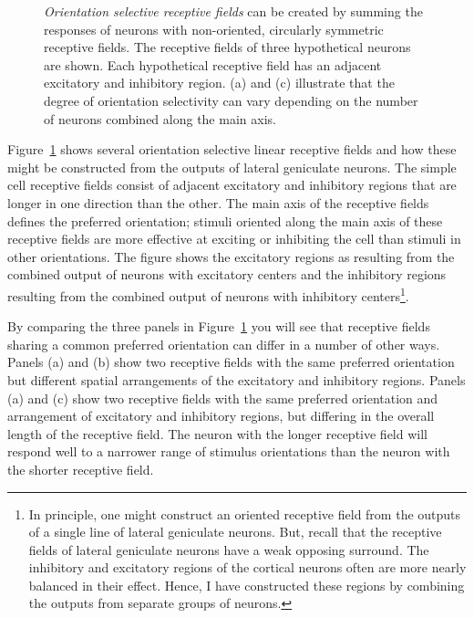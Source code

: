 \begin{figure}
\centerline {
}
\caption[Orientation Theory]{
{\em Orientation selective receptive fields} can be created by summing
the responses of neurons with non-oriented, circularly symmetric
receptive fields.  The receptive fields of three hypothetical neurons
are shown.  Each hypothetical
receptive field has an adjacent excitatory and inhibitory
region.  (a) and (c) illustrate that the degree of
orientation selectivity can vary depending on
the number of neurons combined along the main axis.}
\label{f5:orientedRF}
\end{figure}
Figure~\ref{f5:orientedRF} shows several
orientation selective linear receptive fields and how these
might be constructed from the outputs of lateral geniculate neurons.
The simple cell receptive fields consist of 
adjacent excitatory and inhibitory regions that are longer
in one direction than the other.
The main axis of the receptive fields defines the preferred
orientation;
stimuli oriented along the main axis of these receptive
fields are more effective at exciting or inhibiting the
cell than stimuli in other orientations.
The figure shows the
excitatory regions as resulting from the combined output of
neurons with excitatory centers and the inhibitory regions
resulting from the combined output of neurons with inhibitory centers\footnote{
In principle, one might construct an oriented receptive field
from the outputs of a single line of lateral geniculate neurons.
But, recall that the receptive fields of lateral geniculate
neurons have a weak opposing surround.
The inhibitory and excitatory regions of the
cortical neurons often are more nearly balanced in their effect.
Hence, I have constructed these regions by combining the outputs
from separate groups of neurons.}.

By comparing the three panels in
Figure~\ref{f5:orientedRF} you will see that
receptive fields sharing a common preferred orientation
can differ in a number of other ways.
Panels (a) and (b) show two receptive fields
with the same preferred orientation
but different spatial arrangements
of the excitatory and inhibitory regions.
Panels (a) and (c) show two receptive fields
with the same preferred orientation and arrangement of excitatory and
inhibitory regions, but
differing in the overall length of the receptive field.
The neuron with the longer receptive field will respond well
to a narrower range of stimulus orientations than the
neuron with the shorter receptive field.


